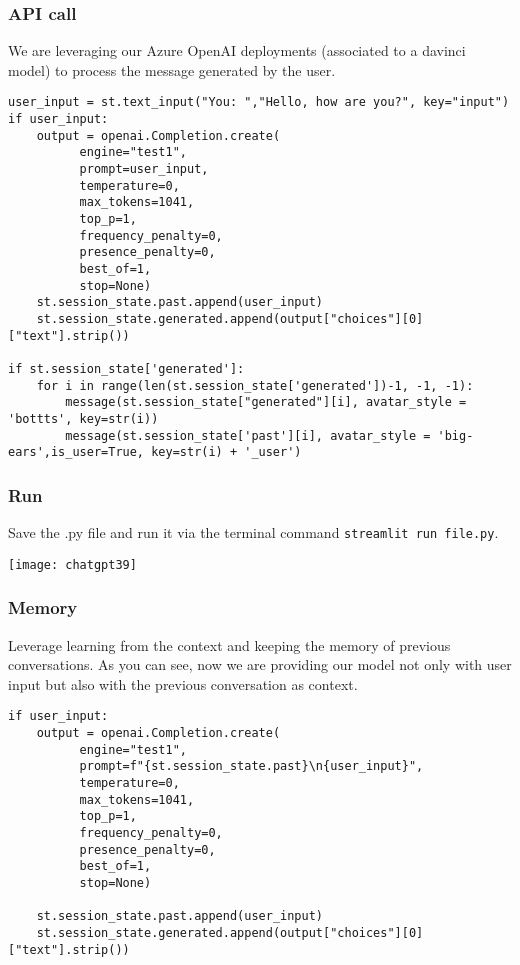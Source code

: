 \begin{frame}[fragile]\frametitle{API call }
We are leveraging our Azure OpenAI deployments (associated to a davinci model) to process the message generated by the user.


\begin{lstlisting}
user_input = st.text_input("You: ","Hello, how are you?", key="input")
if user_input:
    output = openai.Completion.create(
          engine="test1",
          prompt=user_input,
          temperature=0,
          max_tokens=1041,
          top_p=1,
          frequency_penalty=0,
          presence_penalty=0,
          best_of=1,
          stop=None)
    st.session_state.past.append(user_input)
    st.session_state.generated.append(output["choices"][0]["text"].strip())
		
if st.session_state['generated']:
    for i in range(len(st.session_state['generated'])-1, -1, -1):
        message(st.session_state["generated"][i], avatar_style = 'bottts', key=str(i))
        message(st.session_state['past'][i], avatar_style = 'big-ears',is_user=True, key=str(i) + '_user')		
\end{lstlisting}	 


\end{frame}

\begin{frame}[fragile]\frametitle{ Run}
 Save the .py file and run it via the terminal command \lstinline|streamlit run file.py|.

\begin{center}
\texttt{[image: chatgpt39]}
\end{center}

\end{frame}

\begin{frame}[fragile]\frametitle{Memory}

Leverage learning from the context and keeping the memory of previous conversations. As you can see, now we are providing our model not only with user input but also with the previous conversation as context. 


\begin{lstlisting}
if user_input:
    output = openai.Completion.create(
          engine="test1",
          prompt=f"{st.session_state.past}\n{user_input}",
          temperature=0,
          max_tokens=1041,
          top_p=1,
          frequency_penalty=0,
          presence_penalty=0,
          best_of=1,
          stop=None)

    st.session_state.past.append(user_input)
    st.session_state.generated.append(output["choices"][0]["text"].strip())
\end{lstlisting}	 


\end{frame}


